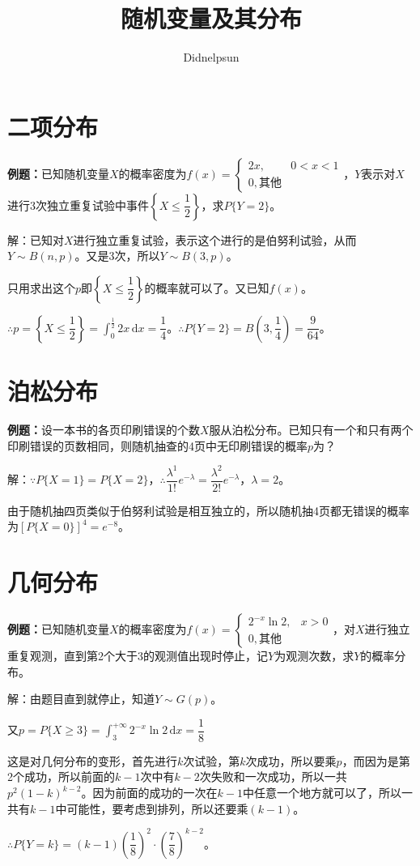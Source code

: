 \documentclass[UTF8, 12pt]{ctexart}
\author{Didnelpsun}
\title{随机变量及其分布}
\date{}
\begin{document}
\maketitle
\pagestyle{empty}
\thispagestyle{empty}
\tableofcontents
\thispagestyle{empty}
\newpage
\pagestyle{plain}
\setcounter{page}{1}

\section{二项分布}

\textbf{例题：}已知随机变量$X$的概率密度为$f(x)=\left\{\begin{array}{ll}
    2x, & 0<x<1 \\
    0, \text{其他}
\end{array}\right.$，$Y$表示对$X$进行3次独立重复试验中事件$\left\{X\leqslant\dfrac{1}{2}\right\}$，求$P\{Y=2\}$。\medskip

解：已知对$X$进行独立重复试验，表示这个进行的是伯努利试验，从而$Y\sim B(n,p)$。又是3次，所以$Y\sim B(3,p)$。

只用求出这个$p$即$\left\{X\leqslant\dfrac{1}{2}\right\}$的概率就可以了。又已知$f(x)$。

$\therefore p=\left\{X\leqslant\dfrac{1}{2}\right\}=\int_0^\frac{1}{2}2x\,\textrm{d}x=\dfrac{1}{4}$。$\therefore P\{Y=2\}=B\left(3,\dfrac{1}{4}\right)=\dfrac{9}{64}$。

\section{泊松分布}

\textbf{例题：}设一本书的各页印刷错误的个数$X$服从泊松分布。已知只有一个和只有两个印刷错误的页数相同，则随机抽查的4页中无印刷错误的概率$p$为？

解：$\because P\{X=1\}=P\{X=2\}$，$\therefore\dfrac{\lambda^1}{1!}e^{-\lambda}=\dfrac{\lambda^2}{2!}e^{-\lambda}$，$\lambda=2$。

由于随机抽四页类似于伯努利试验是相互独立的，所以随机抽4页都无错误的概率为$[P\{X=0\}]^4=e^{-8}$。

\section{几何分布}

\textbf{例题：}已知随机变量$X$的概率密度为$f(x)=\left\{\begin{array}{ll}
    2^{-x}\ln2, & x>0 \\
    0, \text{其他}
\end{array}\right.$，对$X$进行独立重复观测，直到第2个大于3的观测值出现时停止，记$Y$为观测次数，求$Y$的概率分布。

解：由题目直到就停止，知道$Y\sim G(p)$。

又$p=P\{X\geqslant3\}=\int_3^{+\infty}2^{-x}\ln2\,\textrm{d}x=\dfrac{1}{8}$

这是对几何分布的变形，首先进行$k$次试验，第$k$次成功，所以要乘$p$，而因为是第2个成功，所以前面的$k-1$次中有$k-2$次失败和一次成功，所以一共$p^2(1-k)^{k-2}$。因为前面的成功的一次在$k-1$中任意一个地方就可以了，所以一共有$k-1$中可能性，要考虑到排列，所以还要乘$(k-1)$。

$\therefore P\{Y=k\}=(k-1)\left(\dfrac{1}{8}\right)^2\cdot\left(\dfrac{7}{8}\right)^{k-2}$。
\end{document}
